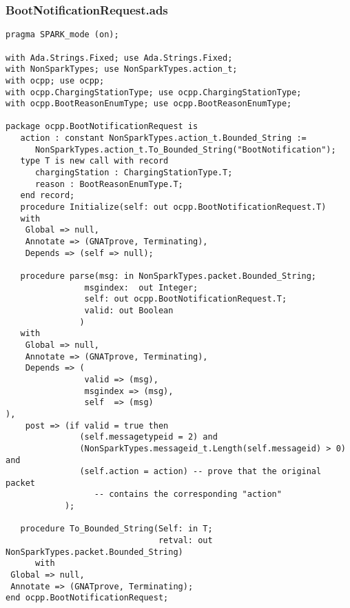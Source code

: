 \documentclass[12pt,openany,a4paper]{book}
\begin{document}
\subsubsection{BootNotificationRequest.ads}
\begin{verbatim}
pragma SPARK_mode (on); 

with Ada.Strings.Fixed; use Ada.Strings.Fixed;
with NonSparkTypes; use NonSparkTypes.action_t; 
with ocpp; use ocpp;
with ocpp.ChargingStationType; use ocpp.ChargingStationType;
with ocpp.BootReasonEnumType; use ocpp.BootReasonEnumType;

package ocpp.BootNotificationRequest is
   action : constant NonSparkTypes.action_t.Bounded_String :=
      NonSparkTypes.action_t.To_Bounded_String("BootNotification"); 
   type T is new call with record
      chargingStation : ChargingStationType.T;
      reason : BootReasonEnumType.T;
   end record;
   procedure Initialize(self: out ocpp.BootNotificationRequest.T)
   with
    Global => null,
    Annotate => (GNATprove, Terminating),
    Depends => (self => null);

   procedure parse(msg: in NonSparkTypes.packet.Bounded_String;
                msgindex:  out Integer;
                self: out ocpp.BootNotificationRequest.T;
                valid: out Boolean
               )
   with
    Global => null,
    Annotate => (GNATprove, Terminating),
    Depends => (
                valid => (msg),
                msgindex => (msg),
                self  => (msg)
),
    post => (if valid = true then
               (self.messagetypeid = 2) and
               (NonSparkTypes.messageid_t.Length(self.messageid) > 0) and
               (self.action = action) -- prove that the original packet 
                  -- contains the corresponding "action"
            );

   procedure To_Bounded_String(Self: in T;
                               retval: out NonSparkTypes.packet.Bounded_String)
      with
 Global => null,
 Annotate => (GNATprove, Terminating);
end ocpp.BootNotificationRequest;
\end{verbatim}
\end{document}
